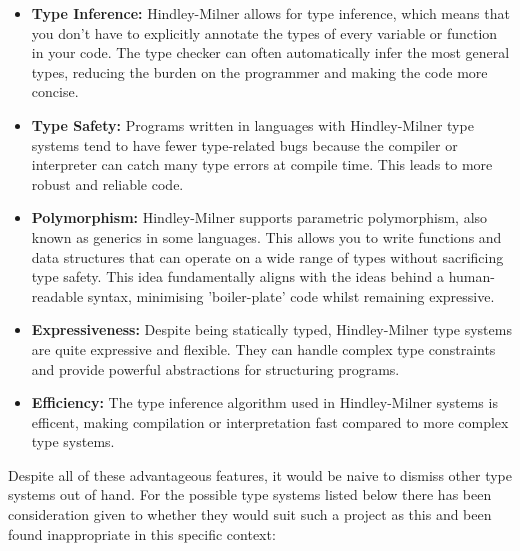 \documentclass{l4proj}
\begin{document}
\begin{itemize}
    \item \textbf{Type Inference:} Hindley-Milner allows for type inference, which means that you don't have to explicitly annotate the types of every variable or function in your code.
    The type checker can often automatically infer the most general types, reducing the burden on the programmer and making the code more concise.
    \item \textbf{Type Safety:} Programs written in languages with Hindley-Milner type systems tend to have fewer type-related bugs because the compiler or interpreter can catch many type errors at compile time.
    This leads to more robust and reliable code.
    \item \textbf{Polymorphism:} Hindley-Milner supports parametric polymorphism, also known as generics in some languages.
    This allows you to write functions and data structures that can operate on a wide range of types without sacrificing type safety.
    This idea fundamentally aligns with the ideas behind a human-readable syntax, minimising 'boiler-plate' code whilst remaining expressive.
    \item \textbf{Expressiveness:} Despite being statically typed, Hindley-Milner type systems are quite expressive and flexible.
    They can handle complex type constraints and provide powerful abstractions for structuring programs.
    \item \textbf{Efficiency:} The type inference algorithm used in Hindley-Milner systems is efficent, making compilation or interpretation fast compared to more complex type systems.
\end{itemize}


Despite all of these advantageous features, it would be naive to dismiss other type systems out of hand.
For the possible type systems listed below there has been consideration given to whether they would suit such a project as this and been found inappropriate in this specific context:
\end{document}
